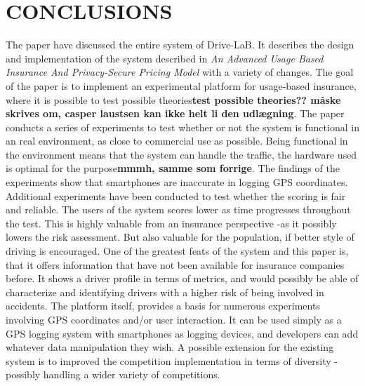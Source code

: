 \section{CONCLUSIONS}\label{sec:conclusion}
The paper have discussed the entire system of Drive-LaB. It describes the design and implementation of the system described in \textit{An Advanced Usage Based Insurance And Privacy-Secure Pricing Model}\citep{sw9_report} with a variety of changes. The goal of the paper is to implement an experimental platform for usage-based insurance, where it is possible to test possible theories\textbf{test possible theories?? måske skrives om, casper laustsen kan ikke helt li den udlægning}. The paper conducts a series of experiments to test whether or not the system is functional in an real environment, as close to commercial use as possible. Being functional in the environment means that the system can handle the traffic, the hardware used is optimal for the purpose\textbf{mmmh, samme som forrige}. The findings of the experiments show that smartphones are inaccurate in logging GPS coordinates. 
Additional experiments have been conducted to test whether the scoring is fair and reliable. The users of the system scores lower as time progresses throughout the test. This is highly valuable from an insurance perspective -as it possibly lowers the risk assessment. But also valuable for the population, if better style of driving is encouraged.
One of the greatest feats of the system and this paper is, that it offers information that have not been available for insurance companies before. It shows a driver profile in terms of metrics, and would possibly be able of characterize and identifying drivers with a higher risk of being involved in accidents.
The platform itself, provides a basis for numerous experiments involving GPS coordinates and/or user interaction. It can be used simply as a GPS logging system with smartphones as logging devices, and developers can add whatever data manipulation they wish.
A possible extension for the existing system is to improved the competition implementation in terms of diversity -possibly handling a wider variety of competitions.


\addtolength{\textheight}{-12cm}   %
